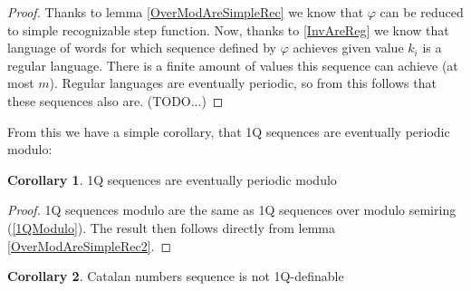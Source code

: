 \documentclass[12pt]{article}
\theoremstyle{definition}
\newtheorem{corollary}{Corollary}[section]
\newtheorem{lemma}[theorem]{Lemma}
\begin{document}
\begin{proof}
    Thanks to lemma \ref{OverModAreSimpleRec} we know that $\varphi$ can be reduced to simple recognizable step function. Now, thanks to \ref{InvAreReg} we know that language of words for which sequence defined by $\varphi$ achieves given value $k_i$ is a regular language. There is a finite amount of values this sequence can achieve (at most $m$). Regular languages are eventually periodic, so from this follows that these sequences also are. (TODO...)
\end{proof}

From this we have a simple corollary, that 1Q sequences are eventually periodic modulo:

\begin{corollary}
    1Q sequences are eventually periodic modulo
\end{corollary}

\begin{proof}
    1Q sequences modulo are the same as 1Q sequences over modulo semiring (\ref{1QModulo}). The result then follows directly from lemma \ref{OverModAreSimpleRec2}.
\end{proof}

\begin{corollary}
    Catalan numbers sequence is not 1Q-definable
\end{corollary}


\end{document}
